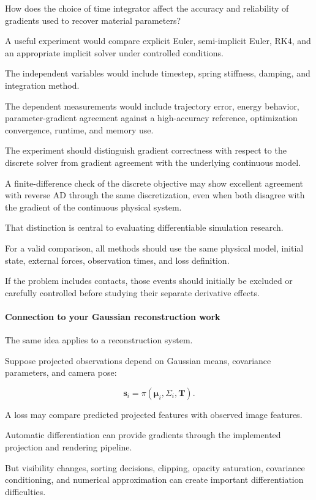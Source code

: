 How does the choice of time integrator affect the accuracy and reliability of gradients used to recover material parameters?

A useful experiment would compare explicit Euler, semi-implicit Euler, RK4, and an appropriate implicit solver under controlled conditions.

The independent variables would include timestep, spring stiffness, damping, and integration method.

The dependent measurements would include trajectory error, energy behavior, parameter-gradient agreement against a high-accuracy reference, optimization convergence, runtime, and memory use.

The experiment should distinguish gradient correctness with respect to the discrete solver from gradient agreement with the underlying continuous model.

A finite-difference check of the discrete objective may show excellent agreement with reverse AD through the same discretization, even when both disagree with the gradient of the continuous physical system.

That distinction is central to evaluating differentiable simulation research.

For a valid comparison, all methods should use the same physical model, initial state, external forces, observation times, and loss definition.

If the problem includes contacts, those events should initially be excluded or carefully controlled before studying their separate derivative effects.

\paragraph{Connection to your Gaussian reconstruction work}\label{connection-to-your-gaussian-reconstruction-work}

The same idea applies to a reconstruction system.

Suppose projected observations depend on Gaussian means, covariance parameters, and camera pose:

\[
\mathbf s_i= \pi(\boldsymbol\mu_i,\Sigma_i,\mathbf T).
\]

A loss may compare predicted projected features with observed image features.

Automatic differentiation can provide gradients through the implemented projection and rendering pipeline.

But visibility changes, sorting decisions, clipping, opacity saturation, covariance conditioning, and numerical approximation can create important differentiation difficulties.

